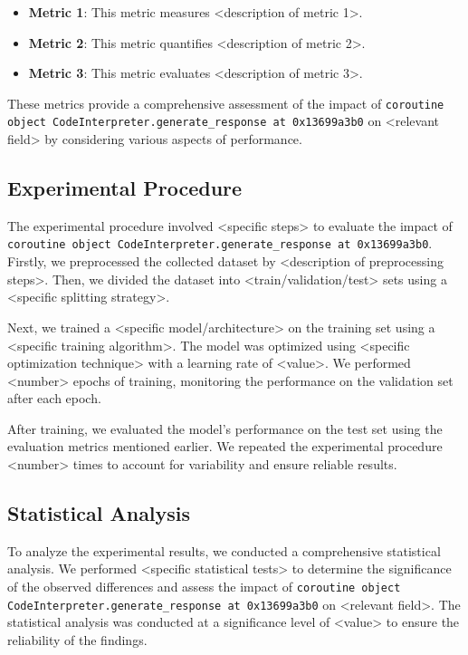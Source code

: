 \documentclass{article}
\begin{document}
\begin{itemize}
  \item \textbf{Metric 1}: This metric measures <description of metric 1>.
  \item \textbf{Metric 2}: This metric quantifies <description of metric 2>.
  \item \textbf{Metric 3}: This metric evaluates <description of metric 3>.
\end{itemize}

These metrics provide a comprehensive assessment of the impact of \texttt{coroutine object CodeInterpreter.generate\_response at 0x13699a3b0} on <relevant field> by considering various aspects of performance.

\subsection{Experimental Procedure}

The experimental procedure involved <specific steps> to evaluate the impact of \texttt{coroutine object CodeInterpreter.generate\_response at 0x13699a3b0}. Firstly, we preprocessed the collected dataset by <description of preprocessing steps>. Then, we divided the dataset into <train/validation/test> sets using a <specific splitting strategy>. 

Next, we trained a <specific model/architecture> on the training set using a <specific training algorithm>. The model was optimized using <specific optimization technique> with a learning rate of <value>. We performed <number> epochs of training, monitoring the performance on the validation set after each epoch.

After training, we evaluated the model's performance on the test set using the evaluation metrics mentioned earlier. We repeated the experimental procedure <number> times to account for variability and ensure reliable results.

\subsection{Statistical Analysis}

To analyze the experimental results, we conducted a comprehensive statistical analysis. We performed <specific statistical tests> to determine the significance of the observed differences and assess the impact of \texttt{coroutine object CodeInterpreter.generate\_response at 0x13699a3b0} on <relevant field>. The statistical analysis was conducted at a significance level of <value> to ensure the reliability of the findings.
\end{document}
